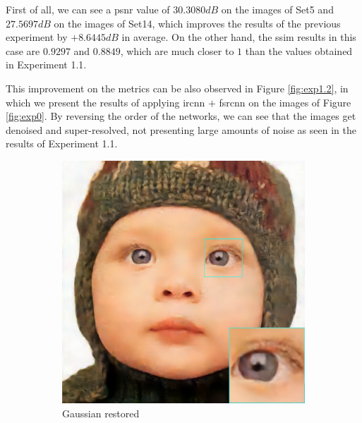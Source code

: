 First of all, we can see a \gls{psnr} value of $30.3080dB$ on the images of Set5 and $27.5697dB$ on the images of Set14, which improves the results of the previous experiment by $+8.6445dB$ in average. On the other hand, the \gls{ssim} results in this case are $0.9297$ and $0.8849$, which are much closer to $1$ than the values obtained in Experiment 1.1.

This improvement on the metrics can be also observed in Figure \ref{fig:exp1.2}, in which we present the results of applying \gls{ircnn} $+$ \gls{fsrcnn} on the images of Figure \ref{fig:exp0}. By reversing the order of the networks, we can see that the images get denoised and super-resolved, not presenting large amounts of noise as seen in the results of Experiment 1.1.

\begin{figure}
	\centering
	\begin{subfigure}{0.24\textwidth}
		\includegraphics[width=\textwidth]{images/exp1.2/gaussian.png}
		\caption{Gaussian restored}
	\end{subfigure}
	\begin{subfigure}{0.24\textwidth}

\end{subfigure}
\end{figure}
